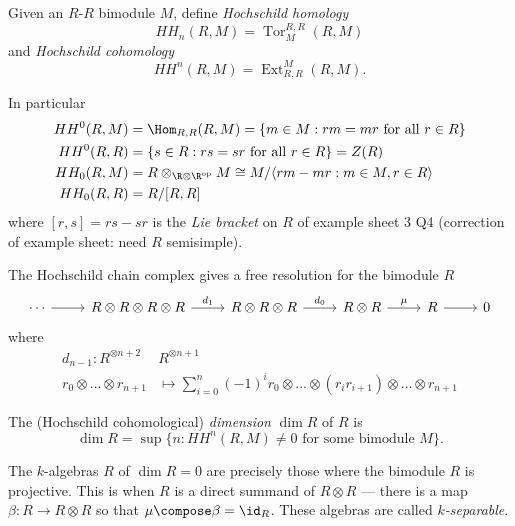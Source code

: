 \documentclass[a4paper]{article}
\DeclareMathOperator{\Tor}{Tor}
\DeclareMathOperator{\Ext}{Ext}
\begin{document}
\begin{definition}
  Given an \(R\)-\(R\) bimodule \(M\), define \emph{Hochschild homology}
  \[
    HH_n(R, M) = \Tor_M^{R, R} (R, M)
  \]
  and \emph{Hochschild cohomology}
  \[
    HH^n(R, M) = \Ext_{R, R}^M(R, M).
  \]
\end{definition}

In particular
\begin{align*}
  HH^0(R, M) &= \Hom_{R, R} (R, M) = \{m \in M: rm = mr \text{ for all } r \in R\} \\
  HH^0(R, R) &= \{s \in R: rs = sr \text{ for all } r \in R\} = Z(R) \\
  HH_0(R, M) &= R \otimes_{\R \otimes \R^{\text{op}}} M \cong M / \langle rm - mr: m \in M, r \in R \rangle \\
  HH_0(R, R) &= R/[R, R]
\end{align*}
where \([r, s] = rs - sr\) is the \emph{Lie bracket} on \(R\) of example sheet 3 Q4 (correction of example sheet: need \(R\) semisimple).

\begin{definition}
  The Hochschild chain complex gives a free resolution for the bimodule \(R\)
  \[
    \begin{tikzcd}
      \cdots \ar[r] & R \otimes R \otimes R \otimes R \ar[r, "d_1"] & R \otimes R \otimes R \ar[r, "d_0"] & R \otimes R \ar[r, "\mu"] & R \ar[r] & 0
    \end{tikzcd}
  \]
  where
  \begin{align*}
    d_{n - 1}: R^{\otimes n + 2} & R^{\otimes n + 1} \\
    r_0 \otimes \dots \otimes r_{n + 1} &\mapsto \sum_{i = 0}^n (-1)^i r_0 \otimes \dots \otimes (r_ir_{i + 1}) \otimes \dots \otimes r_{n + 1}
  \end{align*}
\end{definition}

\begin{definition}
  The (Hochschild cohomological) \emph{dimension} \(\dim R\) of \(R\) is
  \[
    \dim R = \sup \{n: HH^n(R, M) \neq 0 \text{ for some bimodule } M\}.
  \]
\end{definition}

\begin{definition}[separable]
  The \(k\)-algebras \(R\) of \(\dim R = 0\) are precisely  those where the bimodule \(R\) is projective. This is when \(R\) is a direct summand of \(R \otimes R\) --- there is a map \(\beta: R \to R \otimes R\) so that \(\mu \compose \beta = \id_R\). These algebras are called \emph{\(k\)-separable}.
\end{definition}
\end{document}
